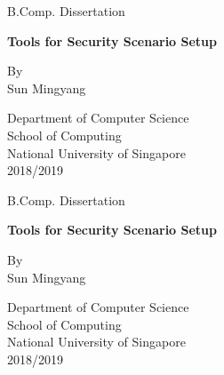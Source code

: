 \documentclass[12pt]{report}
\begin{document}
\begin{titlepage}
\begin{center}
B.Comp. Dissertation\\
\vspace{3cm}

{\large\textbf{Tools for Security Scenario Setup}}

\vspace{5cm}

By\\

Sun Mingyang

\vfill

Department of Computer Science\\
School of Computing\\
National University of Singapore\\
2018/2019
\end{center}
\end{titlepage}

\begin{titlepage}
\begin{center}
B.Comp. Dissertation\\
\vspace{3cm}

{\large\textbf{Tools for Security Scenario Setup}}

\vspace{5cm}

By\\

Sun Mingyang

\vfill

Department of Computer Science\\
School of Computing\\
National University of Singapore\\
2018/2019
\end{center}
\end{titlepage}
\end{document}
